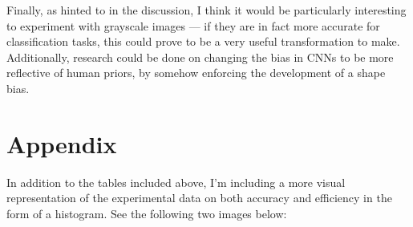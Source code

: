 \documentclass{article}
\begin{document}
Finally, as hinted to in the discussion, I think it would be particularly interesting to experiment with grayscale images --- if they are in fact more accurate for classification tasks, this could prove to be a very useful transformation to make. Additionally, research could be done on changing the bias in CNNs to be more reflective of human priors, by somehow enforcing the development of a shape bias.









\appendix


\section{Appendix}

In addition to the tables included above, I'm including a more visual representation of the experimental data on both accuracy and efficiency in the form of a histogram. See the following two images below:
\end{document}
